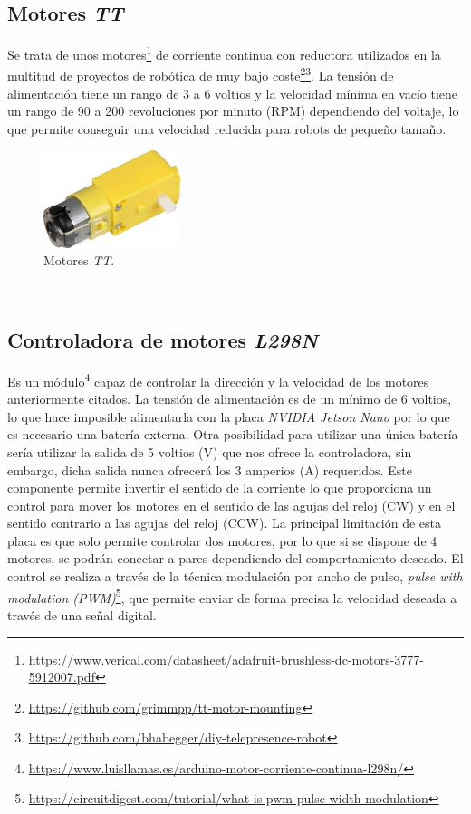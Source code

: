 \subsection{Motores \textit{TT}}
\label{subsection:motortt}
Se trata de unos motores\footnote{\url{https://www.verical.com/datasheet/adafruit-brushless-dc-motors-3777-5912007.pdf}} de corriente continua con reductora utilizados en la multitud de proyectos de robótica de muy bajo coste\footnote{\url{https://github.com/grimmpp/tt-motor-mounting}}\footnote{\url{https://github.com/bhabegger/diy-telepresence-robot}}. La tensión de alimentación tiene un rango de 3 a 6 voltios y la velocidad mínima en vacío tiene un rango de 90 a 200 revoluciones por minuto (RPM) dependiendo del voltaje, lo que permite conseguir una velocidad reducida para robots de pequeño tamaño.\\

\begin{figure} [h!]
	\begin{center}
		\includegraphics[width=4cm]{figs/motorTT}
	\end{center}
	\caption{Motores \textit{TT}.}
	\label{fig:motorTT}
\end{figure}\

\subsection{Controladora de motores \textit{L298N}}
\label{subsection:l298n}
Es un módulo\footnote{\url{https://www.luisllamas.es/arduino-motor-corriente-continua-l298n/}} capaz de controlar la dirección y la velocidad de los motores anteriormente citados. La tensión de alimentación es de un mínimo de 6 voltios, lo que hace imposible alimentarla con la placa \textit{NVIDIA Jetson Nano} por lo que es necesario una batería externa. Otra posibilidad para utilizar una única batería sería utilizar la salida de 5 voltios (V) que nos ofrece la controladora, sin embargo, dicha salida nunca ofrecerá los 3 amperios (A) requeridos. Este componente permite invertir el sentido de la corriente lo que proporciona un control para mover los motores en el sentido de las agujas del reloj (CW) y en el sentido contrario a las agujas del reloj (CCW). La principal limitación de esta placa es que solo permite controlar dos motores, por lo que si se dispone de 4 motores, se podrán conectar a pares dependiendo del comportamiento deseado. El control se realiza a través de la técnica modulación por ancho de pulso, \textit{pulse with modulation (PWM)}\footnote{\url{https://circuitdigest.com/tutorial/what-is-pwm-pulse-width-modulation}}, que permite enviar de forma precisa la velocidad deseada a través de una señal digital.\\

